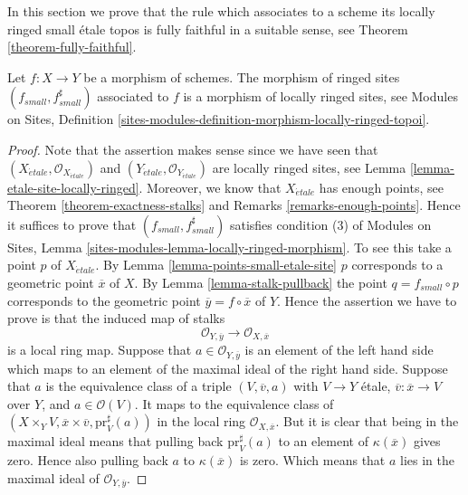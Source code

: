 \noindent
In this section we prove that the rule which associates to a scheme
its locally ringed small \'etale topos is fully faithful in a suitable
sense, see
Theorem \ref{theorem-fully-faithful}.

\begin{lemma}
\label{lemma-morphism-locally-ringed}
Let $f : X \to Y$ be a morphism of schemes.
The morphism of ringed sites $(f_{small}, f_{small}^\sharp)$
associated to $f$ is a morphism of locally ringed sites, see
Modules on Sites,
Definition \ref{sites-modules-definition-morphism-locally-ringed-topoi}.
\end{lemma}

\begin{proof}
Note that the assertion makes sense since we have seen that
$(X_{\acute{e}tale}, \mathcal{O}_{X_{\acute{e}tale}})$ and
$(Y_{\acute{e}tale}, \mathcal{O}_{Y_{\acute{e}tale}})$
are locally ringed sites, see
Lemma \ref{lemma-etale-site-locally-ringed}.
Moreover, we know that $X_{\acute{e}tale}$ has enough points, see
Theorem \ref{theorem-exactness-stalks}
and
Remarks \ref{remarks-enough-points}.
Hence it suffices to prove that $(f_{small}, f_{small}^\sharp)$
satisfies condition (3) of
Modules on Sites,
Lemma \ref{sites-modules-lemma-locally-ringed-morphism}.
To see this take a point $p$ of $X_{\acute{e}tale}$. By
Lemma \ref{lemma-points-small-etale-site}
$p$ corresponds to a geometric point $\overline{x}$ of $X$.
By
Lemma \ref{lemma-stalk-pullback}
the point $q = f_{small} \circ p$ corresponds to the
geometric point $\overline{y} = f \circ \overline{x}$ of $Y$.
Hence the assertion we have to prove is that the induced map
of stalks
$$
\mathcal{O}_{Y, \overline{y}} \longrightarrow \mathcal{O}_{X, \overline{x}}
$$
is a local ring map. Suppose that $a \in \mathcal{O}_{Y, \overline{y}}$
is an element of the left hand side which maps to an element of the maximal
ideal of the right hand side. Suppose that $a$ is the equivalence class
of a triple $(V, \overline{v}, a)$ with $V \to Y$ \'etale,
$\overline{v} : \overline{x} \to V$ over $Y$, and $a \in \mathcal{O}(V)$.
It maps to the equivalence class of
$(X \times_Y V, \overline{x} \times \overline{v}, \text{pr}_V^\sharp(a))$
in the local ring $\mathcal{O}_{X, \overline{x}}$. But it is clear that
being in the maximal ideal means that pulling back $\text{pr}_V^\sharp(a)$
to an element of $\kappa(\overline{x})$ gives zero. Hence also pulling back
$a$ to $\kappa(\overline{x})$ is zero. Which means that $a$ lies in the
maximal ideal of $\mathcal{O}_{Y, \overline{y}}$.
\end{proof}

